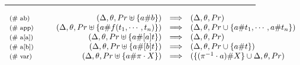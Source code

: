 \documentclass[submission,copyright,creativecommons]{eptcs}
\theoremstyle{plain}
\theoremstyle{definition}
\theoremstyle{remark}
\begin{document}



\begin{figure}[!t]
\centering
\rule{15.3cm}{0.01cm}
    $$    
    \begin{array}{l@{\hspace{1cm}}rll}
        {\text{\footnotesize ($\#$ ab)}} & (\Delta, \theta, Pr \uplus \{a \# b \}) & \Longrightarrow & (\Delta, \theta, Pr) \\
        {\text{\footnotesize ($\#$ app)}} & (\Delta, \theta, Pr \uplus  \{a \# f(t_1,\cdots, t_n)\}) & \Longrightarrow & (\Delta, \theta, Pr \cup \{a \# t_1,\cdots, a \# t_n \}) \; \\
        {\text{\footnotesize ($\#$ a[a])}} & (\Delta, \theta, Pr \uplus \{a \# [a] t \}) & \Longrightarrow & (\Delta, \theta, Pr) \\
        {\text{\footnotesize ($\#$ a[b])}} & (\Delta, \theta, Pr \uplus \{a \# [b] t \}) & \Longrightarrow & (\Delta, \theta, Pr \cup \{a \#t\}) \\
        {\text{\footnotesize ($\#$ var)}} & (\Delta, \theta, Pr \uplus \{a \# \pi \cdot X\}) & \Longrightarrow & (\{(\pi^{-1} \cdot a)\# X\}\cup \Delta, \theta, Pr) \\
    \end{array}
    $$   



\end{figure}
\end{document}

